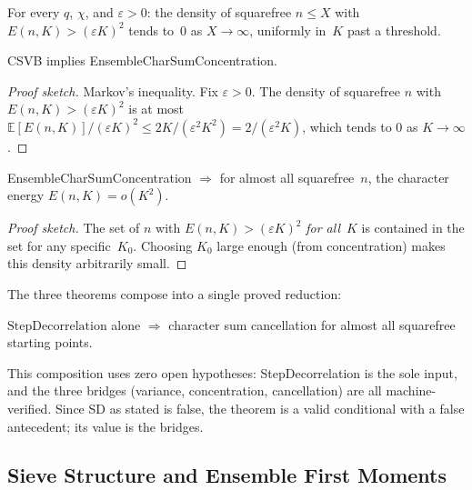 \begin{property}
For every $q$, $\chi$, and $\varepsilon > 0$: the density of
squarefree $n \leq X$ with $E(n, K) > (\varepsilon K)^2$ tends to~$0$
as $X \to \infty$, uniformly in~$K$ past a threshold.
\end{property}

\begin{theorem}
CSVB implies EnsembleCharSumConcentration.
\end{theorem}

\begin{proof}[Proof sketch]
Markov's inequality.  Fix $\varepsilon > 0$.  The density of squarefree
$n$ with $E(n, K) > (\varepsilon K)^2$ is at most
$\mathbb{E}[E(n, K)] / (\varepsilon K)^2 \leq 2K / (\varepsilon^2 K^2)
= 2/(\varepsilon^2 K)$, which tends to $0$ as $K \to \infty$.
\end{proof}

\begin{theorem}
EnsembleCharSumConcentration $\Longrightarrow$ for almost all
squarefree~$n$, the character energy $E(n, K) = o(K^2)$.
\end{theorem}

\begin{proof}[Proof sketch]
The set of $n$ with $E(n, K) > (\varepsilon K)^2$ \emph{for all}~$K$
is contained in the set for any specific~$K_0$.  Choosing $K_0$
large enough (from concentration) makes this density arbitrarily
small.
\end{proof}

\noindent The three theorems compose into a single proved reduction:

\begin{theorem}
\label{thm:sd-cancel}
$\mathrm{StepDecorrelation}$ alone $\Longrightarrow$ character sum
cancellation for almost all squarefree starting points.
\end{theorem}

\noindent This composition uses zero open hypotheses: StepDecorrelation is
the sole input, and the three bridges (variance, concentration,
cancellation) are all machine-verified.  Since SD as stated is false,
the theorem is a valid conditional with a false antecedent; its value
is the bridges.

\subsection{Sieve Structure and Ensemble First Moments}
\label{sec:sieve-first-moment}

